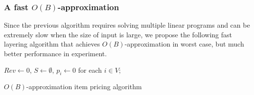 %		
%		

\subsubsection{A fast $O(B)$-approximation}

Since the previous algorithm requires solving multiple linear programs and can be extremely slow when the size of input is large, we
propose the following fast layering algorithm that achieves $O(B)$-approximation in worst case, but much better performance in experiment.

\begin{algorithm}[!htp]
	\DontPrintSemicolon 
	\BlankLine
	$Rev \leftarrow 0$, $S\leftarrow \emptyset$, $p_i\leftarrow 0$ for each $i\in V$;\\
	\caption{$O(B)$-approximation item pricing algorithm}
	\label{algo:layering}
\end{algorithm}

